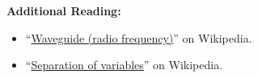 
{\bf Additional Reading:}
\begin{itemize}
\item ``\href{https://en.wikipedia.org/wiki/Waveguide_(radio_frequency)}{Waveguide (radio frequency)}'' on Wikipedia.
\item ``\href{https://en.wikipedia.org/wiki/Separation_of_variables}{Separation of variables}'' on Wikipedia.
\end{itemize}


